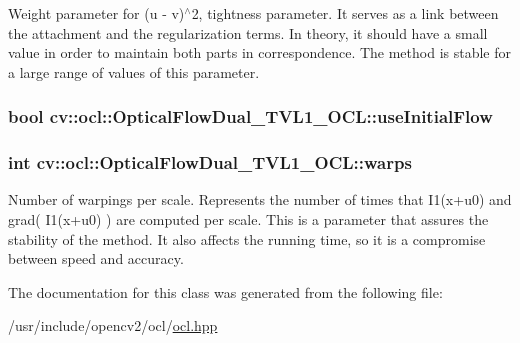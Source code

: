 Weight parameter for (u -\/ v)$^\wedge$2, tightness parameter. It serves as a link between the attachment and the regularization terms. In theory, it should have a small value in order to maintain both parts in correspondence. The method is stable for a large range of values of this parameter. \hypertarget{classcv_1_1ocl_1_1OpticalFlowDual__TVL1__OCL_a73bf24cc0d08b2e845315d27375350b4}{
\subsubsection[{use\-Initial\-Flow}]{\setlength{\rightskip}{0pt plus 5cm}bool cv\-::ocl\-::\-Optical\-Flow\-Dual\-\_\-\-T\-V\-L1\-\_\-\-O\-C\-L\-::use\-Initial\-Flow}}\label{classcv_1_1ocl_1_1OpticalFlowDual__TVL1__OCL_a73bf24cc0d08b2e845315d27375350b4}
\hypertarget{classcv_1_1ocl_1_1OpticalFlowDual__TVL1__OCL_abdd8504e9e17b64712cdb3fdf72ad544}{
\subsubsection[{warps}]{\setlength{\rightskip}{0pt plus 5cm}int cv\-::ocl\-::\-Optical\-Flow\-Dual\-\_\-\-T\-V\-L1\-\_\-\-O\-C\-L\-::warps}}\label{classcv_1_1ocl_1_1OpticalFlowDual__TVL1__OCL_abdd8504e9e17b64712cdb3fdf72ad544}
Number of warpings per scale. Represents the number of times that I1(x+u0) and grad( I1(x+u0) ) are computed per scale. This is a parameter that assures the stability of the method. It also affects the running time, so it is a compromise between speed and accuracy. 

The documentation for this class was generated from the following file\-:\begin{DoxyCompactItemize}
\item 
/usr/include/opencv2/ocl/\hyperlink{ocl_2ocl_8hpp}{ocl.\-hpp}\end{DoxyCompactItemize}
